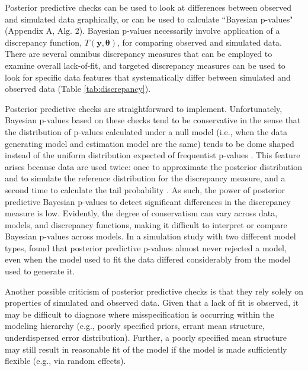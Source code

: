 \documentclass[12pt,english]{article}
\begin{document}
\begin{spacing}{1.9}
Posterior predictive checks can be used to look at differences between
observed and simulated data graphically, or can be used to calculate
``Bayesian p-values" (Appendix A, Alg. 2).  Bayesian p-values
necessarily involve application of a discrepancy function,
$T(\textbf{y},\boldsymbol{\theta})$, for comparing observed and
simulated data.  There are several omnibus discrepancy measures that
can be employed to examine overall lack-of-fit, and targeted
discrepancy measures can be used to look for specific data features
that systematically differ between simulated and observed data (Table
\ref{tab:discrepancy}).

Posterior predictive checks are straightforward to implement.
Unfortunately, Bayesian p-values based on these checks tend to be
conservative in the sense that the distribution of p-values calculated
under a null model (i.e., when the data generating model and
estimation model are the same) tends to be dome shaped instead of the
uniform distribution expected of frequentist p-values
\citep{RobinsEtAl2000}. This feature arises because data are used
twice: once to approximate the posterior distribution and to simulate
the reference distribution for the discrepancy measure, and a second
time to calculate the tail probability \citep{BayarriBerger2000}.  As
such, the power of posterior predictive Bayesian p-values to detect
significant differences in the discrepancy measure is low.  Evidently,
the degree of conservatism can vary across data, models, and
discrepancy functions, making it difficult to interpret or compare
Bayesian p-values across models. In a simulation study with two
different model types, \citet{Zhang2014} found that posterior
predictive p-values almost never rejected a model, even when the model
used to fit the data differed considerably from the model used to
generate it.

Another possible criticism of posterior predictive checks is that they
rely solely on properties of simulated and observed data.  Given that
a lack of fit is observed, it may be difficult to diagnose where
misspecification is occurring within the modeling hierarchy (e.g.,
poorly specified priors, errant mean structure, underdispersed error
distribution).  Further, a poorly specified mean structure may still
result in reasonable fit of the model if the model is made
sufficiently flexible (e.g., via random effects).


\end{spacing}
\end{document}
